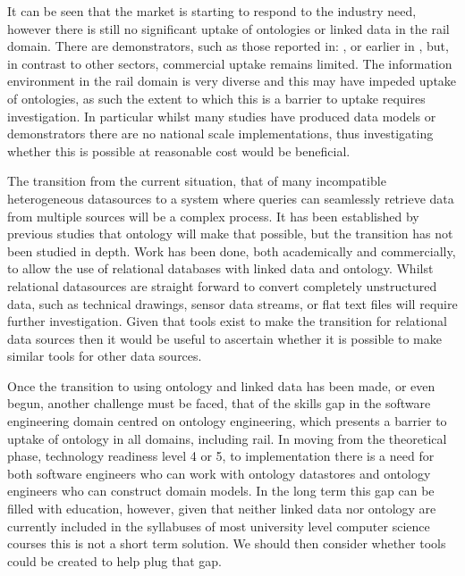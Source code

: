 It can be seen that the market is starting to respond to the industry need, however there is still no significant uptake of ontologies or linked data in the rail domain. There are demonstrators, such as those reported in: \citep{Bhatti2016}, \citep{Tutcher2013} or earlier in \citep{Kopf2010}, but, in contrast to other sectors, commercial uptake remains limited. The information environment in the rail domain is very diverse and this may have impeded uptake of ontologies, as such the extent to which this is a barrier to uptake requires investigation.
In particular whilst many studies have produced data models or demonstrators there are no national scale implementations, thus investigating whether this is possible at reasonable cost would be beneficial. 

The transition from the current situation, that of many incompatible heterogeneous datasources to a system where queries can seamlessly retrieve data from multiple sources will be a complex process. It has been established by previous studies that ontology will make that possible, but the transition has not been studied in depth. Work has been done, both academically and commercially, to allow the use of relational databases with linked data and ontology. Whilst relational datasources are straight forward to convert completely unstructured data, such as technical drawings, sensor data streams, or flat text files will require further investigation. Given that tools exist to make the transition for relational data sources then it would be useful to ascertain whether it is possible to make similar tools for other data sources.

Once the transition to using ontology and linked data has been made, or even begun, another challenge must be faced, that of the skills gap in the software engineering domain centred on ontology engineering, which presents a barrier to uptake of ontology in all domains, including rail. In moving from the theoretical phase, technology readiness level 4 or 5, to implementation there is a need for both software engineers who can work with ontology datastores and ontology engineers who can construct domain models. In the long term this gap can be filled with education, however, given that neither linked data nor ontology are currently included in the syllabuses of most university level computer science courses this is not a short term solution. We should then consider whether tools could be created to help plug that gap.


